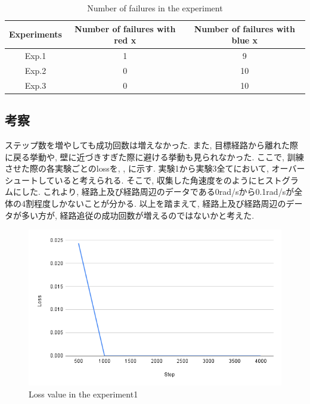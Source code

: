 \begin{table}[h]
  \centering
  \begin{tabular}{|c|c|c|} \hline
    Experiments & Number of failures with red x & Number of failures with blue x \\ \hline
    Exp.1 & 1 & 9 \\ \hline
    Exp.2 & 0 & 10 \\ \hline
    Exp.3 & 0 & 10 \\ \hline
  \end{tabular}
  \caption{Number of failures in the experiment}
  \label{tb:fail1}
\end{table}

\newpage
\subsection{考察}
ステップ数を増やしても成功回数は増えなかった.  また, 目標経路から離れた際に戻る挙動や, 壁に近づきすぎた際に避ける挙動も見られなかった. ここで, 訓練させた際の各実験ごとのlossを, , に示す. 実験1から実験3全てにおいて, オーバーシュートしていると考えられる. そこで, 収集した角速度をのようにヒストグラムにした. これより, 経路上及び経路周辺のデータである0rad/sから0.1rad/sが全体の4割程度しかないことが分かる. 以上を踏まえて, 経路上及び経路周辺のデータが多い方が, 経路追従の成功回数が増えるのではないかと考えた. 

\newpage
\begin{figure}[h]
  \centering
  \includegraphics[keepaspectratio, scale=0.31]{images/exp1-4000.png}
  \caption{Loss value in the experiment1}
  \label{Fig:exp1-4000}
  \end{figure}

